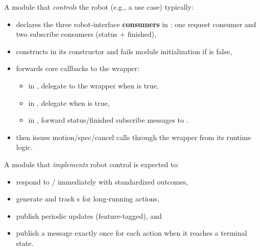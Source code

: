 A module that \emph{controls} the robot (e.g., a use case) typically:
\begin{itemize}
    \item declares the three robot-interface \textbf{consumers} in : one request consumer and two subscribe consumers (status + finished),
    \item constructs  in its constructor and fails module initialization if  is false,
    \item forwards core callbacks to the wrapper:
    \begin{itemize}
        \item in , delegate to the wrapper when  is true,
        \item in , delegate when  is true,
        \item in , forward status/finished subscribe messages to .
    \end{itemize}
    \item then issues motion/spec/cancel calls through the wrapper from its runtime logic.
\end{itemize}

A module that \emph{implements} robot control is expected to:
\begin{itemize}
    \item respond to / immediately with standardized outcomes,
    \item generate and track s for long-running actions,
    \item publish periodic  updates (feature-tagged), and
    \item publish a  message exactly once for each  action when it reaches a terminal state.
\end{itemize}


